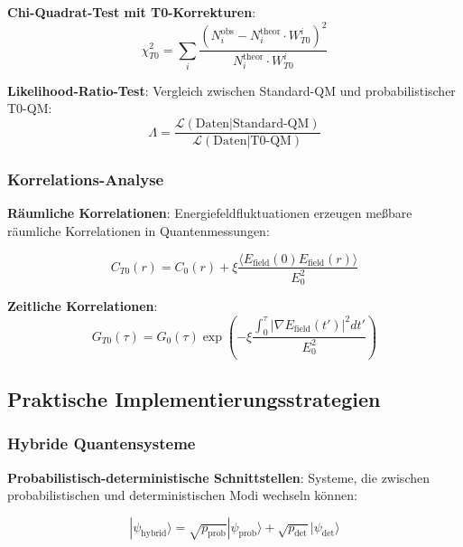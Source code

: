 \documentclass[12pt,a4paper]{article}
\newcommand{\xipar}{\xi}
\theoremstyle{definition}
\theoremstyle{remark}
\begin{document}
\textbf{Chi-Quadrat-Test mit T0-Korrekturen}:
\begin{equation}
	\chi_{T0}^2 = \sum_i \frac{(N_i^{\text{obs}} - N_i^{\text{theor}} \cdot W_{T0}^i)^2}{N_i^{\text{theor}} \cdot W_{T0}^i}
	\label{eq:chi_square_t0}
\end{equation}

\textbf{Likelihood-Ratio-Test}:
Vergleich zwischen Standard-QM und probabilistischer T0-QM:
\begin{equation}
	\Lambda = \frac{\mathcal{L}(\text{Daten}|\text{Standard-QM})}{\mathcal{L}(\text{Daten}|\text{T0-QM})}
	\label{eq:likelihood_ratio}
\end{equation}

\subsubsection{Korrelations-Analyse}

\textbf{Räumliche Korrelationen}:
Energiefeldfluktuationen erzeugen meßbare räumliche Korrelationen in Quantenmessungen:

\begin{equation}
	C_{T0}(r) = C_0(r) + \xipar \frac{\langle E_{\text{field}}(0) E_{\text{field}}(r) \rangle}{E_0^2}
	\label{eq:spatial_correlations}
\end{equation}

\textbf{Zeitliche Korrelationen}:
\begin{equation}
	G_{T0}(\tau) = G_0(\tau) \exp\left(-\xipar \frac{\int_0^\tau |\nabla E_{\text{field}}(t')|^2 dt'}{E_0^2}\right)
	\label{eq:temporal_correlations}
\end{equation}

\subsection{Praktische Implementierungsstrategien}

\subsubsection{Hybride Quantensysteme}

\textbf{Probabilistisch-deterministische Schnittstellen}:
Systeme, die zwischen probabilistischen und deterministischen Modi wechseln können:

\begin{equation}
	|\psi_{\text{hybrid}}\rangle = \sqrt{p_{\text{prob}}} |\psi_{\text{prob}}\rangle + \sqrt{p_{\text{det}}} |\psi_{\text{det}}\rangle
	\label{eq:hybrid_states}
\end{equation}
\end{document}
